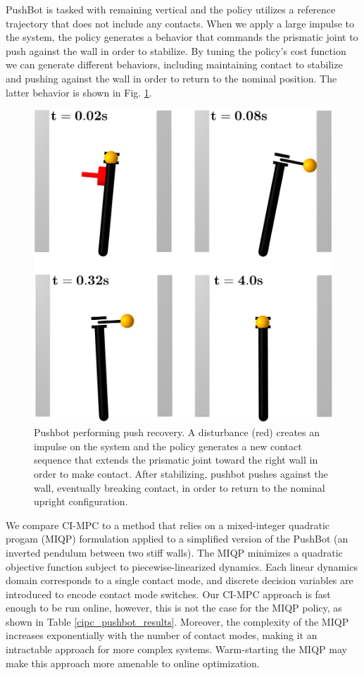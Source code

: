 PushBot is tasked with remaining vertical and the policy utilizes a reference trajectory that does not include any contacts. When we apply a large impulse to the system, the policy generates a behavior that commands the prismatic joint to push against the wall in order to stabilize. By tuning the policy's cost function we can generate different behaviors, including maintaining contact to stabilize and pushing against the wall in order to return to the nominal position. The latter behavior is shown in Fig. \ref{cipc_pushbot_push_recovery}.

\begin{figure}[H]
	\centering
	\includegraphics[width=.45\textwidth]{ci_pc/pushbot_figure_timings.png}
	\caption[Pushbot performing push recovery]{Pushbot performing push recovery. A disturbance (red) creates an impulse on the system and the policy generates a new contact sequence that extends the prismatic joint toward the right wall in order to make contact. After stabilizing, pushbot pushes against the wall, eventually breaking contact, in order to return to the nominal upright configuration.}
	\label{cipc_pushbot_push_recovery}
\end{figure}

We compare CI-MPC to a method that relies on a mixed-integer quadratic progam (MIQP) formulation \cite{bemporad1999control} applied to a simplified version of the PushBot (an inverted pendulum between two stiff walls). The MIQP minimizes a quadratic objective function subject to piecewise-linearized dynamics. Each linear dynamics domain corresponds to a single contact mode, and discrete decision variables are introduced to encode contact mode switches. Our CI-MPC approach is fast enough to be run online, however, this is not the case for the MIQP policy, as shown in Table \ref{cipc_pushbot_results}. Moreover, the complexity of the MIQP increases exponentially with the number of contact modes, making it an intractable approach for more complex systems. Warm-starting the MIQP \cite{marcucci2020warm} may make this approach more amenable to online optimization.

